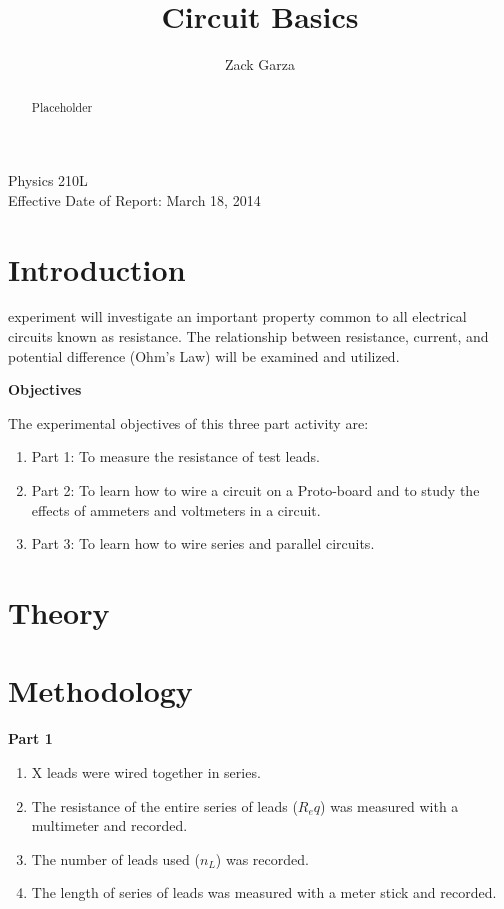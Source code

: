 \documentclass[twocolumn,english]{IEEEtran}
\theoremstyle{plain}
\theoremstyle{plain}
\begin{document}
\title{Circuit Basics}


\author{Zack Garza}


\IEEEspecialpapernotice
{Physics 210L \\
Effective Date of Report: March 18, 2014}


\maketitle
\begin{abstract}
Placeholder
\end{abstract}
\tableofcontents

\section{Introduction}
 experiment will investigate an important property common to all electrical circuits known as resistance. The relationship between resistance, current, and potential difference (Ohm's Law) will be examined and utilized.

\begin{centering}
 \textbf{Objectives}
\end{centering}
The experimental objectives of this three part activity are:
\begin{enumerate}
 \item Part 1: To measure the resistance of test leads.
 \item Part 2: To learn how to wire a circuit on a Proto-board and to study the effects of ammeters and voltmeters in a circuit.
 \item Part 3: To learn how to wire series and parallel circuits.
\end{enumerate}


\section{Theory}

\section{Methodology}
\textbf{Part 1}
\begin{enumerate}
 \item X leads were wired together in series.
 \item The resistance of the entire series of leads ($R_eq$) was measured with a multimeter and recorded.
 \item The number of leads used ($n_L$) was recorded.
 \item The length of series of leads was measured with a meter stick and recorded.
\end{enumerate}
\end{document}
